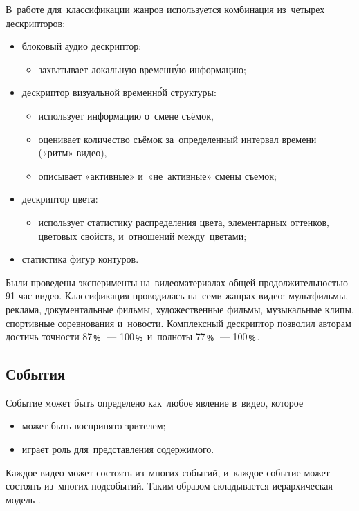 В~работе \cite{Ionescu:2012} для~классификации жанров используется
комбинация из~четырех дескрипторов:
\begin{itemize}
    \item блоковый аудио дескриптор:
    \begin{itemize}
        \item захватывает локальную временну́ю информацию;
    \end{itemize}
    \item дескриптор визуальной временно́й структуры:
    \begin{itemize}
        \item использует информацию о~смене съёмок,
        \item оценивает количество съёмок
            за~определенный интервал времени («ритм» видео),
        \item описывает «активные» и~«не~активные» смены съемок;
    \end{itemize}
    \item дескриптор цвета:
    \begin{itemize}
        \item использует статистику распределения цвета,
        элементарных оттенков, цветовых свойств, и~отношений между~цветами;
    \end{itemize}
    \item статистика фигур контуров.
\end{itemize}

Были проведены эксперименты на~видеоматериалах общей продолжительностью
91 час видео. Классификация проводилась на~семи жанрах видео:
мультфильмы, реклама, документальные фильмы, художественные фильмы,
музыкальные клипы, спортивные соревнования и~новости.
Комплексный дескриптор позволил авторам достичь
точности  87﹪~— 100﹪ и~полноты 77﹪~— 100﹪.



\subsection{События}

Событие может быть определено как~любое явление в~видео,
которое
\begin{itemize}
    \item может быть воспринято зрителем;
    \item играет роль для~представления содержимого.
\end{itemize}
Каждое видео может состоять из~многих событий,
и~каждое событие может состоять из~многих подсобытий.
Таким образом складывается иерархическая модель \cite{Chang:2002}.

